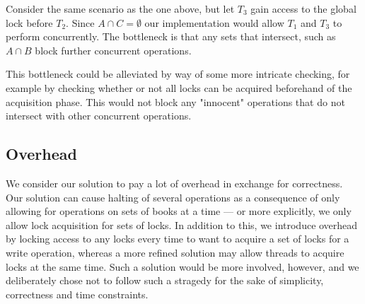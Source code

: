 Consider the same scenario as the one above, but let $T_3$ gain access to the
global lock before $T_2$. Since $A \cap C = \emptyset$ our implementation would
allow $T_1$ and $T_3$ to perform concurrently. The bottleneck is that any sets
that intersect, such as $A \cap B$ block further concurrent operations.

This bottleneck could be alleviated by way of some more intricate checking, for
example by checking whether or not all locks can be acquired beforehand of the
acquisition phase. This would not block any "innocent" operations that do not
intersect with other concurrent operations.

\subsection{Overhead}
We consider our solution to pay a lot of overhead in exchange for correctness.
Our solution can cause halting of several operations as a consequence of only
allowing for operations on sets of books at a time --- or more explicitly, we
only allow lock acquisition for sets of locks. In addition to this, we introduce
overhead by locking access to any locks every time to want to acquire a set of
locks for a write operation, whereas a more refined solution may allow threads
to acquire locks at the same time. Such a solution would be more involved, however,
and we deliberately chose not to follow such a stragedy for the sake of simplicity,
correctness and time constraints.
